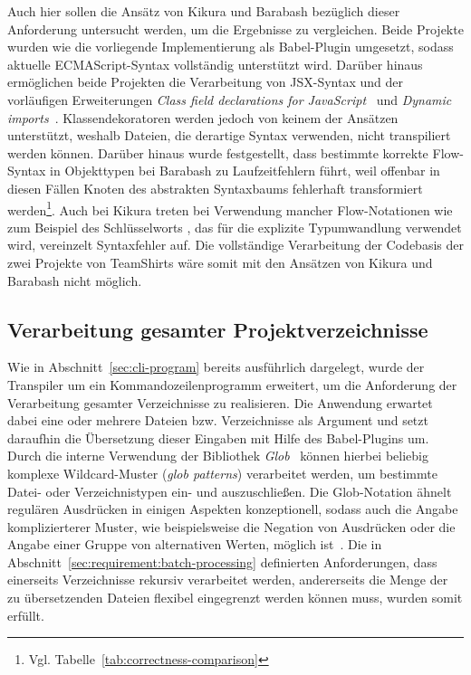 Auch hier sollen die Ansätz von Kikura und Barabash bezüglich dieser Anforderung untersucht werden, um die Ergebnisse zu vergleichen. Beide Projekte wurden wie die vorliegende Implementierung als Babel-Plugin umgesetzt, sodass aktuelle ECMAScript-Syntax vollständig unterstützt wird. Darüber hinaus ermöglichen beide Projekten die Verarbeitung von JSX-Syntax und der vorläufigen Erweiterungen \textit{Class field declarations for JavaScript}~\autocite{ES_PROPOSAL:CLASS_FIELDS} und \textit{Dynamic imports}~\autocite{ES_PROPOSAL:DYNAMIC_IMPORTS}. Klassendekoratoren werden jedoch von keinem der Ansätzen unterstützt, weshalb Dateien, die derartige Syntax verwenden, nicht transpiliert werden können. Darüber hinaus wurde festgestellt, dass bestimmte korrekte Flow-Syntax in Objekttypen bei Barabash zu Laufzeitfehlern führt, weil offenbar in diesen Fällen Knoten des abstrakten Syntaxbaums fehlerhaft transformiert werden\footnote{Vgl. Tabelle~\ref{tab:correctness-comparison}}. Auch bei Kikura treten bei Verwendung mancher Flow-Notationen wie zum Beispiel des Schlüsselworts , das für die explizite Typumwandlung verwendet wird, vereinzelt Syntaxfehler auf. Die vollständige Verarbeitung der Codebasis der zwei Projekte von TeamShirts wäre somit mit den Ansätzen von Kikura und Barabash nicht möglich.

\subsection{Verarbeitung gesamter Projektverzeichnisse}

Wie in Abschnitt~\ref{sec:cli-program} bereits ausführlich dargelegt, wurde der Transpiler um ein Kommandozeilenprogramm erweitert, um die Anforderung der Verarbeitung gesamter Verzeichnisse zu realisieren. Die Anwendung erwartet dabei eine oder mehrere Dateien bzw. Verzeichnisse als Argument und setzt daraufhin die Übersetzung dieser Eingaben mit Hilfe des Babel-Plugins um.
Durch die interne Verwendung der Bibliothek \textit{Glob}~\autocite{NPM:GLOB} können hierbei beliebig komplexe Wildcard-Muster (\textit{glob patterns}) verarbeitet werden, um bestimmte Datei- oder Verzeichnistypen ein- und auszuschließen. Die Glob-Notation ähnelt regulären Ausdrücken in einigen Aspekten konzeptionell, sodass auch die Angabe komplizierterer Muster, wie beispielsweise die Negation von Ausdrücken oder die Angabe einer Gruppe von alternativen Werten, möglich ist~\autocite{MAN:GLOB}.
Die in Abschnitt~\ref{sec:requirement:batch-processing} definierten Anforderungen, dass einerseits Verzeichnisse rekursiv verarbeitet werden, andererseits die Menge der zu übersetzenden Dateien flexibel eingegrenzt werden können muss, wurden somit erfüllt.

